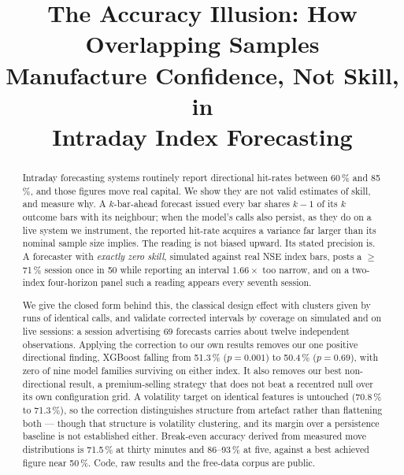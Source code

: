 \documentclass[conference]{IEEEtran}
\begin{document}
\title{The Accuracy Illusion: How Overlapping Samples\\
Manufacture Confidence, Not Skill, in\\
Intraday Index Forecasting}

\author{
\and
{}
}

\maketitle

\begin{abstract}
Intraday forecasting systems routinely report directional hit-rates between
60\,\% and 85\,\%, and those figures move real capital. We show they are not
valid estimates of skill, and measure why. A $k$-bar-ahead forecast issued every
bar shares $k{-}1$ of its $k$ outcome bars with its neighbour; when the model's
calls also persist, as they do on a live system we instrument, the reported
hit-rate acquires a variance far larger than its nominal sample size implies.
The reading is not biased upward. Its stated precision is. A forecaster with
\emph{exactly zero skill}, simulated against real NSE index bars, posts a
$\geq$\,71\,\% session once in 50 while reporting an interval $1.66\times$ too
narrow, and on a two-index four-horizon panel such a reading appears every
seventh session.

We give the closed form behind this, the classical design effect with clusters
given by runs of identical calls, and validate corrected intervals by coverage
on simulated and on live sessions: a session advertising 69 forecasts carries
about twelve independent observations. Applying the correction to our own
results removes our one positive directional finding, XGBoost falling from
51.3\,\% ($p = 0.001$) to 50.4\,\% ($p = 0.69$), with zero of nine model
families surviving on either index. It also removes our
best non-directional result, a premium-selling strategy that does not beat a
recentred null over its own configuration grid. A volatility target on identical
features is untouched (70.8\,\% to 71.3\,\%), so the correction distinguishes
structure from artefact rather than flattening both --- though that structure is
volatility clustering, and its margin over a persistence baseline is not
established either. Break-even accuracy derived
from measured move distributions is 71.5\,\% at thirty minutes and 86--93\,\% at
five, against a best achieved figure near 50\,\%. Code, raw results and the
free-data corpus are public.
\end{abstract}
\end{document}
